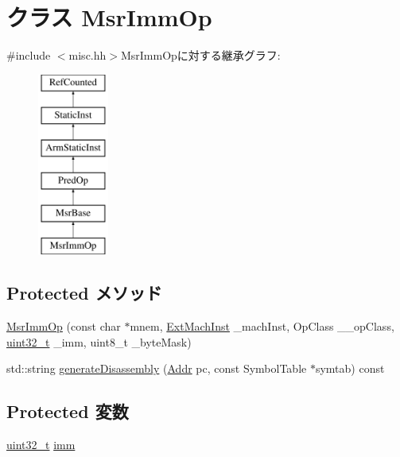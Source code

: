 \hypertarget{classMsrImmOp}{
\section{クラス MsrImmOp}
\label{classMsrImmOp}
}


{\ttfamily \#include $<$misc.hh$>$}MsrImmOpに対する継承グラフ:\begin{figure}[H]
\begin{center}
\leavevmode
\includegraphics[height=6cm]{classMsrImmOp}
\end{center}
\end{figure}
\subsection*{Protected メソッド}
\begin{DoxyCompactItemize}
\item 
\hyperlink{classMsrImmOp_acdabee2e3e1f777fe4e73ce9decacb69}{MsrImmOp} (const char $\ast$mnem, \hyperlink{classStaticInst_a5605d4fc727eae9e595325c90c0ec108}{ExtMachInst} \_\-machInst, OpClass \_\-\_\-opClass, \hyperlink{Type_8hh_a435d1572bf3f880d55459d9805097f62}{uint32\_\-t} \_\-imm, uint8\_\-t \_\-byteMask)
\item 
std::string \hyperlink{classMsrImmOp_a95d323a22a5f07e14d6b4c9385a91896}{generateDisassembly} (\hyperlink{classm5_1_1params_1_1Addr}{Addr} pc, const SymbolTable $\ast$symtab) const 
\end{DoxyCompactItemize}
\subsection*{Protected 変数}
\begin{DoxyCompactItemize}
\item 
\hyperlink{Type_8hh_a435d1572bf3f880d55459d9805097f62}{uint32\_\-t} \hyperlink{classMsrImmOp_a3aa9e175bd81b38df0e566643d5d4f8d}{imm}
\end{DoxyCompactItemize}


